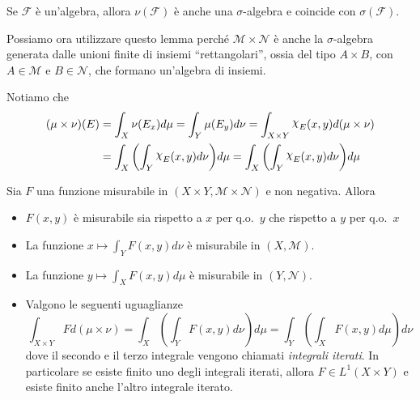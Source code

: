 \begin{lemma}
    Se \(\mathcal{F}\) è un'algebra, allora \(\nu(\mathcal{F})\) è anche una
    \(\sigma\)-algebra e coincide con \(\sigma(\mathcal{F})\).
\end{lemma}
Possiamo ora utilizzare questo lemma perché \(\mathcal{M} \times \mathcal{N}\) è
anche la \(\sigma\)-algebra generata dalle unioni finite di insiemi
``rettangolari'', ossia del tipo \(A \times B\), con \(A \in \mathcal{M}\) e \(B
\in \mathcal{N}\), che formano un'algebra di insiemi.

Notiamo che
\begin{align*}
    {\left( \mu \times \nu \right)} (E) &= \int_{X} \nu(E_x) d\mu = \int_{Y}
    \mu(E_y) d\nu = \int_{X \times Y} \rchi_{E}(x, y) d(\mu \times \nu) \\
        &= \int_X {\left( \int_Y \rchi_E(x, y) d\nu\right)} d\mu = \int_X
        {\left( \int_Y \rchi_E(x, y) d\nu\right)} d\mu
\end{align*}
\begin{theorem}[Tonelli]
    Sia \(F\) una funzione misurabile in \((X \times Y, \mathcal{M} \times
    \mathcal{N})\) e non negativa. Allora
    \begin{itemize}
        \item \(F(x, y)\) è misurabile sia rispetto a \(x\) per q.o.~\(y\) che
            rispetto a \(y\) per q.o.~\(x\)
        \item La funzione \(\displaystyle x \mapsto \int_Y F(x,y) d\nu\) è
            misurabile in \((X, \mathcal{M})\).
        \item La funzione \(\displaystyle y \mapsto \int_X F(x,y) d\mu\) è
            misurabile in \((Y, \mathcal{N})\).
        \item Valgono le seguenti uguaglianze
            \[
                \int_{X \times Y} F d(\mu \times \nu) = \int_X \left( \int_Y
                    F(x,y) d\nu \right) d\mu = \int_Y \left( \int_X F(x,y) d\mu
                        \right) d\nu
            \]
            dove il secondo e il terzo integrale vengono chiamati
            \emph{integrali iterati}. In particolare se esiste finito uno degli
            integrali iterati, allora \(F \in L^{1}(X \times Y)\) e esiste
            finito anche l'altro integrale iterato.
    \end{itemize}
\end{theorem}
